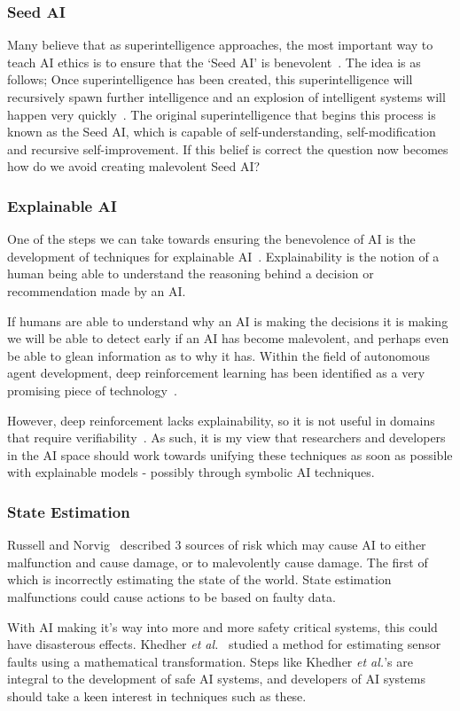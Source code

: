 \documentclass[]{final_report}
\begin{document}
\subsubsection{Seed AI}
Many believe that as superintelligence approaches, the most important way to teach AI ethics is to ensure that the `Seed AI' is benevolent~\cite{yudkowsky2001creating}. The idea is as follows; Once superintelligence has been created, this superintelligence will recursively spawn further intelligence and an explosion of intelligent systems will happen very quickly~\cite{good1966speculations}. The original superintelligence that begins this process is known as the Seed AI, which is capable of self-understanding, self-modification and recursive self-improvement. If this belief is correct the question now becomes how do we avoid creating malevolent Seed AI? 

\subsubsection{Explainable AI}
One of the steps we can take towards ensuring the benevolence of AI is the development of techniques for explainable AI~\cite{darpaxai}. Explainability is the notion of a human being able to understand the reasoning behind a decision or recommendation made by an AI.\par 
If humans are able to understand why an AI is making the decisions it is making we will be able to detect early if an AI has become malevolent, and perhaps even be able to glean information as to why it has. Within the field of autonomous agent development, deep reinforcement learning has been identified as a very promising piece of technology~\cite{mnih2013playing, mnih2016asynchronous}.\par 
However, deep reinforcement lacks explainability, so it is not useful in domains that require verifiability~\cite{garnelo2016towards}. As such, it is my view that researchers and developers in the AI space should work towards unifying these techniques as soon as possible with explainable models - possibly through symbolic AI techniques.

\subsubsection{State Estimation}
Russell and Norvig~\cite{russell2016artificial} described 3 sources of risk which may cause AI to either malfunction and cause damage, or to malevolently cause damage. The first of which is incorrectly estimating the state of the world. State estimation malfunctions could cause actions to be based on faulty data.\par 
With AI making it's way into more and more safety critical systems, this could have disasterous effects. Khedher \textit{et al.}~\cite{khedher2009state} studied a method for estimating sensor faults using a mathematical transformation. Steps like Khedher \textit{et al.}'s are integral to the development of safe AI systems, and developers of AI systems should take a keen interest in techniques such as these.
\end{document}
